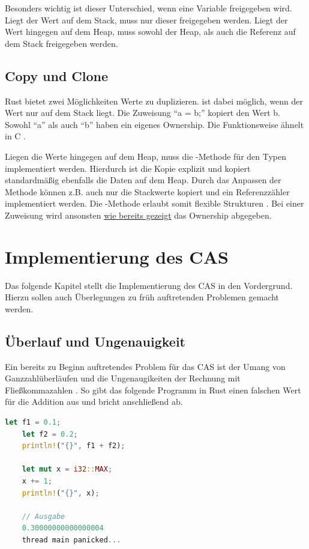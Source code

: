 \documentclass[11pt,a4paper, ngerman]{article}
\begin{document}
Besonders wichtig ist dieser Unterschied, wenn eine Variable freigegeben wird. Liegt der Wert auf dem Stack, muss nur dieser freigegeben werden. Liegt der Wert hingegen auf dem Heap, muss sowohl der Heap, als auch die Referenz auf dem Stack freigegeben werden.

\subsection{Copy und Clone}
Rust bietet zwei Möglichkeiten Werte zu duplizieren.  ist dabei möglich, wenn der Wert nur auf dem Stack liegt. Die Zuweisung ``a = b;'' kopiert den Wert b. Sowohl ``a'' als auch ``b'' haben ein eigenes Ownership. Die Funktionsweise ähnelt  in C \cite[S. 259 ff.]{SK19}.

Liegen die Werte hingegen auf dem Heap, muss die -Methode für den Typen implementiert werden. Hierdurch ist die Kopie explizit und kopiert standardmäßig ebenfalls die Daten auf dem Heap. Durch das Anpassen der Methode können z.B. auch nur die Stackwerte kopiert und ein Referenzzähler implementiert werden. Die -Methode erlaubt somit flexible Strukturen \cite[S. 260 ff.]{SK19}. Bei einer Zuweisung wird ansonsten \hyperref[sec:Ownership]{wie bereits gezeigt} das Ownership abgegeben.

\newpage

\section{Implementierung des CAS}
Das folgende Kapitel stellt die Implementierung des CAS in den Vordergrund. Hierzu sollen auch Überlegungen zu früh auftretenden Problemen gemacht werden.

\subsection{Überlauf und Ungenauigkeit}
Ein bereits zu Beginn auftretendes Problem für das CAS ist der Umang von Ganzzahlüberläufen und die Ungenaugikeiten der Rechnung mit Fließkommazahlen \cite{IEEE754}. So gibt das folgende Programm in Rust einen falschen Wert für die Addition aus und bricht anschließend ab.

\begin{lstlisting}[language=rust, caption={Überlauf und Ungenauigkeit}]
    let f1 = 0.1;
    let f2 = 0.2;
    println!("{}", f1 + f2);

    let mut x = i32::MAX;
    x += 1;
    println!("{}", x);

    // Ausgabe
    0.30000000000000004
    thread main panicked...
\end{lstlisting}
\end{document}
